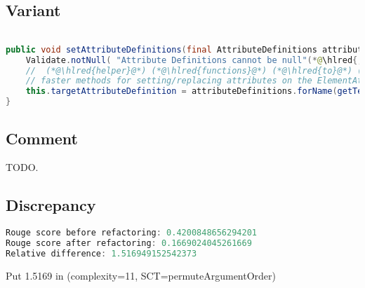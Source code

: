 \documentclass[11pt]{article}
\DeclareRobustCommand{\hlred}[1]{{\sethlcolor{YellowOrange}\hl{#1}}}
\begin{document}
\subsection{Variant}

\begin{lstlisting}[language=java]

public void setAttributeDefinitions(final AttributeDefinitions attributeDefinitions) {
    Validate.notNull( "Attribute Definitions cannot be null"(*@\hlred{,attributeDefinitions}@*));
    //  (*@\hlred{helper}@*) (*@\hlred{functions}@*) (*@\hlred{to}@*) (*@\hlred{implement}@*) (*@\hlred{more}@*) (*@\hlred{specific}@*) (*@\hlred{behavior}@*) (*@\hlred{and}@*) (*@\hlred{other}@*) (*@\hlred{general}@*) (*@\hlred{purpose}@*) (*@\hlred{behavior}@*) to (*@\hlred{call}@*) (*@\hlred{in this}@*)
    // faster methods for setting/replacing attributes on the ElementAttributes implementation
    this.targetAttributeDefinition = attributeDefinitions.forName(getTemplateMode(), this.targetAttrCompleteName);
}
\end{lstlisting}

\subsection{Comment}

TODO.

\subsection{Discrepancy}

\begin{lstlisting}[language=java]
Rouge score before refactoring: 0.4200848656294201
Rouge score after refactoring: 0.1669024045261669
Relative difference: 1.516949152542373
\end{lstlisting}

Put 1.5169 in (complexity=11, SCT=permuteArgumentOrder)
\end{document}
